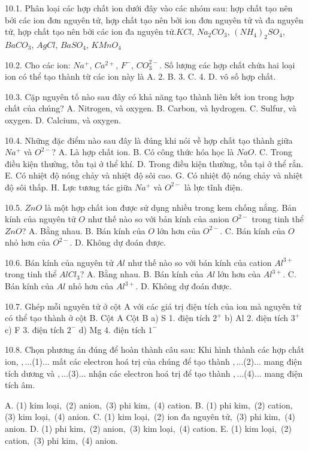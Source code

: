 10.1. Phân loại các hợp chất ion dưới đây vào các nhóm sau: hợp chất tạo nên bởi các ion đơn nguyên tử, hợp chất tạo nên bởi ion đơn nguyên tử và đa nguyên tử, hợp chất tạo nên bởi các ion đa nguyên tử.$KCl$, $Na_2CO_3$, $(NH_4)_2SO_4$, $BaCO_3$, $AgCl$, $BaSO_4$, $KMnO_4$

10.2. Cho các ion: $Na^+$, $Ca^{2+}$, $F^-$, $CO_3^{2-}$. Số lượng các hợp chất chứa hai loại ion có thể tạo thành từ các ion này là
A. 2.
B. 3.
C. 4.
D. vô số hợp chất.

10.3. Cặp nguyên tố nào sau đây có khả năng tạo thành liên kết ion trong hợp chất của chúng?
A. Nitrogen, và oxygen.
B. Carbon, và hydrogen.
C. Sulfur, và oxygen.
D. Calcium, và oxygen.

10.4. Những đặc điểm nào sau đây là đúng khi nói về hợp chất tạo thành giữa $Na^+$ và $O^{2-}$?
A. Là hợp chất ion.
B. Có công thức hóa học là $NaO$.
C. Trong điều kiện thường, tồn tại ở thể khí.
D. Trong điều kiện thường, tồn tại ở thể rắn.
E. Có nhiệt độ nóng chảy và nhiệt độ sôi cao.
G. Có nhiệt độ nóng chảy và nhiệt độ sôi thấp.
H. Lực tương tác giữa $Na^+$ và $O^{2-}$ là lực tĩnh điện.

10.5. $ZnO$ là một hợp chất ion được sử dụng nhiều trong kem chống nắng. Bản kính của nguyên tử $O$ như thế nào so với bản kính của anion $O^{2-}$ trong tinh thể $ZnO$?
A. Bằng nhau.
B. Bán kính của $O$ lớn hơn của $O^{2-}$.
C. Bán kính của $O$ nhỏ hơn của $O^{2-}$.
D. Không dự đoán được.

10.6. Bán kính của nguyên tử $Al$ như thế nào so với bán kính của cation $Al^{3+}$ trong tinh thể $AlCl_3$?
A. Bằng nhau.
B. Bán kính của $Al$ lớn hơn của $Al^{3+}$.
C. Bán kính của $Al$ nhỏ hơn của $Al^{3+}$.
D. Không dự đoán được.

10.7. Ghép mỗi nguyên tử ở cột A với các giá trị điện tích của ion mà nguyên tử có thể tạo thành ở cột B.
Cột A                      	Cột B
a) S                         	1. điện tích $2^{+}$
b) Al                       	2. điện tích $3^{+}$
c) F                         	3. điện tích $2^{-}$
d) Mg                      	4. điện tích $1^{-}$

10.8. Chọn phương án đúng để hoàn thành câu sau:
Khi hình thành các hợp chất ion, $,$...(1)... mất các electron hoá trị của chúng để tạo thành $,$...(2)... mang điện tích dương và $,$...(3)... nhận các electron hoá trị để tạo thành $,$...(4)... mang điện tích âm.

A. (1) kim loại$,$ (2) anion$,$ (3) phi kim$,$ (4) cation.
B. (1) phi kim$,$ (2) cation$,$ (3) kim loại$,$ (4) anion.
C. (1) kim loại$,$ (2) ion đa nguyên tử$,$ (3) phi kim$,$ (4) anion.
D. (1) phi kim$,$ (2) anion$,$ (3) kim loại$,$ (4) cation.
E. (1) kim loại$,$ (2) cation$,$ (3) phi kim$,$ (4) anion.


